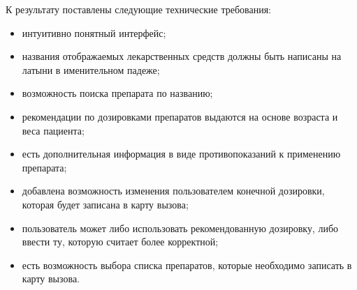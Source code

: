 К результату поставлены следующие технические требования:
\begin{itemize}

\item интуитивно понятный интерфейс;

\item названия отображаемых лекарственных средств должны быть написаны на латыни в именительном падеже;

\item возможность поиска препарата по названию;

\item рекомендации по дозировками препаратов выдаются на основе возраста и веса пациента;

\item есть дополнительная информация в виде противопоказаний к применению препарата;

\item добавлена возможность изменения пользователем конечной дозировки, которая будет записана в карту вызова;

\item пользователь может либо использовать рекомендованную дозировку, либо ввести ту, которую считает более корректной;

\item есть возможность выбора списка препаратов, которые необходимо записать в карту вызова.
\end{itemize}





